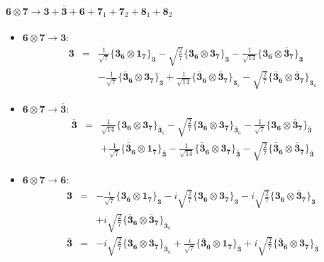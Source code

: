 \documentclass[english]{article}
\newcommand{\subcg}[3]{\big\{ {#1}\otimes{#2}\big\}^{}_{#3}}
\newcommand{\rep}[1]{\mathbf{#1}}
\begin{document}
\paragraph*{\Large $\rep{6}\otimes\rep{7}\to\rep{3}+\rep{\bar{3}}+\rep{6}+\rep{7}_{1}+\rep{7}_{2}+\rep{8}_{1}+\rep{8}_{2}$}
\begin{itemize}
\item $\rep{6}\otimes\rep{7}\to\rep{3}$:
\begin{eqnarray*}
\rep{3} &=& \frac{1}{\sqrt{7}}\subcg{\rep{3}_{\rep{6}}}{\rep{1}_{\rep{7}}}{\rep{3}}-\sqrt{\frac{2}{7}}\subcg{\rep{3}_{\rep{6}}}{\rep{3}_{\rep{7}}}{\rep{3}}-\frac{1}{\sqrt{14}}\subcg{\rep{3}_{\rep{6}}}{\rep{\bar{3}}_{\rep{7}}}{\rep{3}} \\ 
 & & -\frac{1}{\sqrt{7}}\subcg{\rep{\bar{3}}_{\rep{6}}}{\rep{3}_{\rep{7}}}{\rep{3}}+\frac{1}{\sqrt{14}}\subcg{\rep{\bar{3}}_{\rep{6}}}{\rep{\bar{3}}_{\rep{7}}}{\rep{3}_{s}}-\sqrt{\frac{2}{7}}\subcg{\rep{\bar{3}}_{\rep{6}}}{\rep{\bar{3}}_{\rep{7}}}{\rep{3}_{a}}
\end{eqnarray*}
\item $\rep{6}\otimes\rep{7}\to\rep{\bar{3}}$:
\begin{eqnarray*}
\rep{\bar{3}} &=& \frac{1}{\sqrt{14}}\subcg{\rep{3}_{\rep{6}}}{\rep{3}_{\rep{7}}}{\rep{\bar{3}}_{s}}-\sqrt{\frac{2}{7}}\subcg{\rep{3}_{\rep{6}}}{\rep{3}_{\rep{7}}}{\rep{\bar{3}}_{a}}-\frac{1}{\sqrt{7}}\subcg{\rep{3}_{\rep{6}}}{\rep{\bar{3}}_{\rep{7}}}{\rep{\bar{3}}} \\ 
 & & +\frac{1}{\sqrt{7}}\subcg{\rep{\bar{3}}_{\rep{6}}}{\rep{1}_{\rep{7}}}{\rep{\bar{3}}}-\frac{1}{\sqrt{14}}\subcg{\rep{\bar{3}}_{\rep{6}}}{\rep{3}_{\rep{7}}}{\rep{\bar{3}}}-\sqrt{\frac{2}{7}}\subcg{\rep{\bar{3}}_{\rep{6}}}{\rep{\bar{3}}_{\rep{7}}}{\rep{\bar{3}}}
\end{eqnarray*}
\item $\rep{6}\otimes\rep{7}\to\rep{6}$:
\begin{eqnarray*}
\rep{3} &=& -\frac{i}{\sqrt{7}}\subcg{\rep{3}_{\rep{6}}}{\rep{1}_{\rep{7}}}{\rep{3}}-i \sqrt{\frac{2}{7}}\subcg{\rep{3}_{\rep{6}}}{\rep{3}_{\rep{7}}}{\rep{3}}-i \sqrt{\frac{2}{7}}\subcg{\rep{3}_{\rep{6}}}{\rep{\bar{3}}_{\rep{7}}}{\rep{3}} \\ 
 & & +i \sqrt{\frac{2}{7}}\subcg{\rep{\bar{3}}_{\rep{6}}}{\rep{\bar{3}}_{\rep{7}}}{\rep{3}_{a}}
\\
\rep{\bar{3}} &=& -i \sqrt{\frac{2}{7}}\subcg{\rep{3}_{\rep{6}}}{\rep{3}_{\rep{7}}}{\rep{\bar{3}}_{a}}+\frac{i}{\sqrt{7}}\subcg{\rep{\bar{3}}_{\rep{6}}}{\rep{1}_{\rep{7}}}{\rep{\bar{3}}}+i \sqrt{\frac{2}{7}}\subcg{\rep{\bar{3}}_{\rep{6}}}{\rep{3}_{\rep{7}}}{\rep{\bar{3}}} \\ 

\end{eqnarray*}
\end{itemize}
\end{document}
